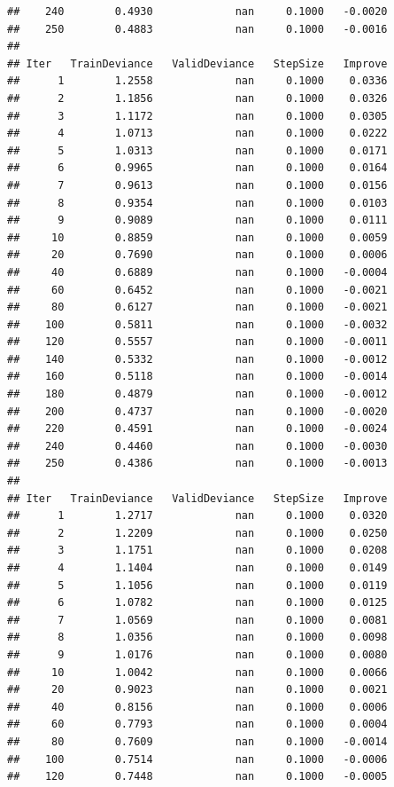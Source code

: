 \documentclass[
]{book}
\begin{document}
\begin{verbatim}
##    240        0.4930             nan     0.1000   -0.0020
##    250        0.4883             nan     0.1000   -0.0016
## 
## Iter   TrainDeviance   ValidDeviance   StepSize   Improve
##      1        1.2558             nan     0.1000    0.0336
##      2        1.1856             nan     0.1000    0.0326
##      3        1.1172             nan     0.1000    0.0305
##      4        1.0713             nan     0.1000    0.0222
##      5        1.0313             nan     0.1000    0.0171
##      6        0.9965             nan     0.1000    0.0164
##      7        0.9613             nan     0.1000    0.0156
##      8        0.9354             nan     0.1000    0.0103
##      9        0.9089             nan     0.1000    0.0111
##     10        0.8859             nan     0.1000    0.0059
##     20        0.7690             nan     0.1000    0.0006
##     40        0.6889             nan     0.1000   -0.0004
##     60        0.6452             nan     0.1000   -0.0021
##     80        0.6127             nan     0.1000   -0.0021
##    100        0.5811             nan     0.1000   -0.0032
##    120        0.5557             nan     0.1000   -0.0011
##    140        0.5332             nan     0.1000   -0.0012
##    160        0.5118             nan     0.1000   -0.0014
##    180        0.4879             nan     0.1000   -0.0012
##    200        0.4737             nan     0.1000   -0.0020
##    220        0.4591             nan     0.1000   -0.0024
##    240        0.4460             nan     0.1000   -0.0030
##    250        0.4386             nan     0.1000   -0.0013
## 
## Iter   TrainDeviance   ValidDeviance   StepSize   Improve
##      1        1.2717             nan     0.1000    0.0320
##      2        1.2209             nan     0.1000    0.0250
##      3        1.1751             nan     0.1000    0.0208
##      4        1.1404             nan     0.1000    0.0149
##      5        1.1056             nan     0.1000    0.0119
##      6        1.0782             nan     0.1000    0.0125
##      7        1.0569             nan     0.1000    0.0081
##      8        1.0356             nan     0.1000    0.0098
##      9        1.0176             nan     0.1000    0.0080
##     10        1.0042             nan     0.1000    0.0066
##     20        0.9023             nan     0.1000    0.0021
##     40        0.8156             nan     0.1000    0.0006
##     60        0.7793             nan     0.1000    0.0004
##     80        0.7609             nan     0.1000   -0.0014
##    100        0.7514             nan     0.1000   -0.0006
##    120        0.7448             nan     0.1000   -0.0005

\end{verbatim}
\end{document}
